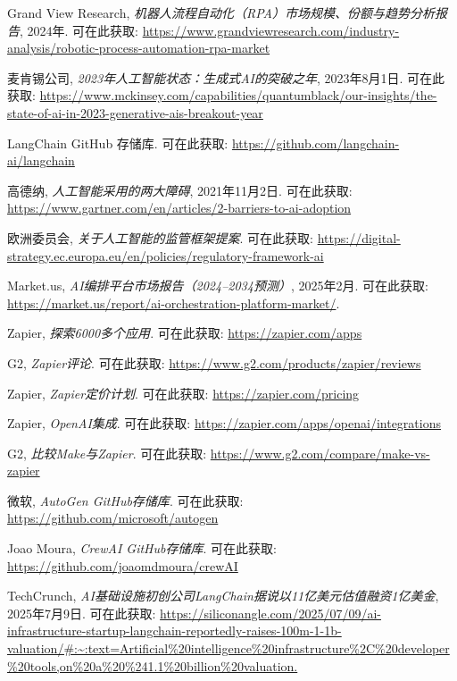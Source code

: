 \documentclass[11pt, a4paper, oneside]{article}
\begin{document}
\begin{thebibliography}{99}
    Grand View Research, \textit{机器人流程自动化（RPA）市场规模、份额与趋势分析报告}, 2024年. 可在此获取: \url{https://www.grandviewresearch.com/industry-analysis/robotic-process-automation-rpa-market}

    麦肯锡公司, \textit{2023年人工智能状态：生成式AI的突破之年}, 2023年8月1日. 可在此获取: \url{https://www.mckinsey.com/capabilities/quantumblack/our-insights/the-state-of-ai-in-2023-generative-ais-breakout-year}

    LangChain GitHub 存储库. 可在此获取: \url{https://github.com/langchain-ai/langchain}

    高德纳, \textit{人工智能采用的两大障碍}, 2021年11月2日. 可在此获取: \url{https://www.gartner.com/en/articles/2-barriers-to-ai-adoption}

    欧洲委员会, \textit{关于人工智能的监管框架提案}. 可在此获取: \url{https://digital-strategy.ec.europa.eu/en/policies/regulatory-framework-ai}
        
    Market.us, \textit{AI编排平台市场报告（2024--2034预测）}, 2025年2月. 可在此获取: \url{https://market.us/report/ai-orchestration-platform-market/}.

    Zapier, \textit{探索6000多个应用}. 可在此获取: \url{https://zapier.com/apps}

    G2, \textit{Zapier评论}. 可在此获取: \url{https://www.g2.com/products/zapier/reviews}

    Zapier, \textit{Zapier定价计划}. 可在此获取: \url{https://zapier.com/pricing}

    Zapier, \textit{OpenAI集成}. 可在此获取: \url{https://zapier.com/apps/openai/integrations}

    G2, \textit{比较Make与Zapier}. 可在此获取: \url{https://www.g2.com/compare/make-vs-zapier}

    微软, \textit{AutoGen GitHub存储库}. 可在此获取: \url{https://github.com/microsoft/autogen}

    Joao Moura, \textit{CrewAI GitHub存储库}. 可在此获取: \url{https://github.com/joaomdmoura/crewAI}

    TechCrunch, \textit{AI基础设施初创公司LangChain据说以11亿美元估值融资1亿美金}, 2025年7月9日. 可在此获取: \url{https://siliconangle.com/2025/07/09/ai-infrastructure-startup-langchain-reportedly-raises-100m-1-1b-valuation/#:~:text=Artificial%20intelligence%20infrastructure%2C%20developer%20tools,on%20a%20%241.1%20billion%20valuation.}


\end{thebibliography}
\end{document}
